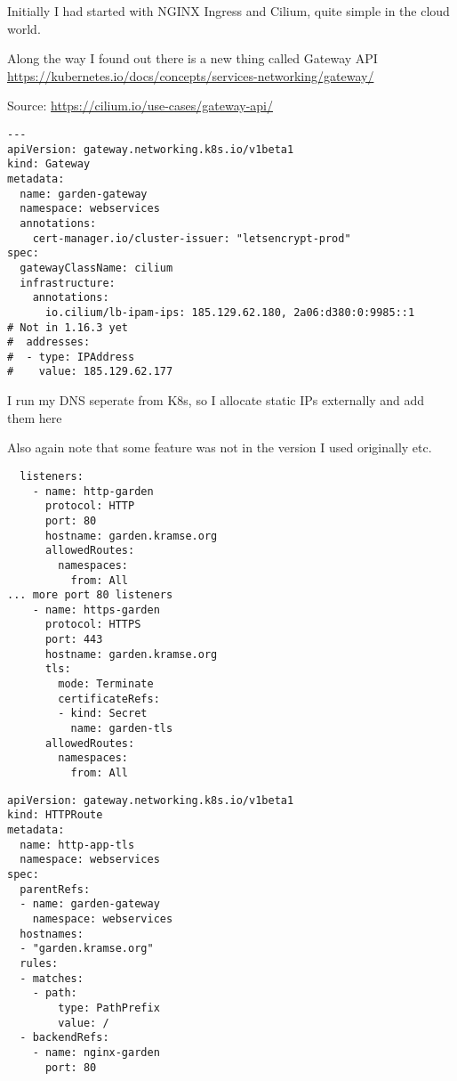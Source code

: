 \documentclass[Screen16to9,17pt]{foils}
\begin{document}

Initially I had started with NGINX Ingress and Cilium, quite simple in the cloud world.


Along the way I found out there is a new thing called Gateway API\\
 \url{https://kubernetes.io/docs/concepts/services-networking/gateway/}

Source: \url{https://cilium.io/use-cases/gateway-api/}

\begin{verbatim}
---
apiVersion: gateway.networking.k8s.io/v1beta1
kind: Gateway
metadata:
  name: garden-gateway
  namespace: webservices
  annotations:
    cert-manager.io/cluster-issuer: "letsencrypt-prod"
spec:
  gatewayClassName: cilium
  infrastructure:
    annotations:
      io.cilium/lb-ipam-ips: 185.129.62.180, 2a06:d380:0:9985::1
# Not in 1.16.3 yet
#  addresses:
#  - type: IPAddress
#    value: 185.129.62.177
\end{verbatim}

\begin{list2}
\item I run my DNS seperate from K8s, so I allocate static IPs externally and add them here
\item Also again note that some feature was not in the version I used originally etc.
\end{list2}

\begin{verbatim}
  listeners:
    - name: http-garden
      protocol: HTTP
      port: 80
      hostname: garden.kramse.org
      allowedRoutes:
        namespaces:
          from: All
... more port 80 listeners
    - name: https-garden
      protocol: HTTPS
      port: 443
      hostname: garden.kramse.org
      tls:
        mode: Terminate
        certificateRefs:
        - kind: Secret
          name: garden-tls
      allowedRoutes:
        namespaces:
          from: All
\end{verbatim}




\begin{verbatim}
apiVersion: gateway.networking.k8s.io/v1beta1
kind: HTTPRoute
metadata:
  name: http-app-tls
  namespace: webservices
spec:
  parentRefs:
  - name: garden-gateway
    namespace: webservices
  hostnames:
  - "garden.kramse.org"
  rules:
  - matches:
    - path:
        type: PathPrefix
        value: /
  - backendRefs:
    - name: nginx-garden
      port: 80
\end{verbatim}
\end{document}
